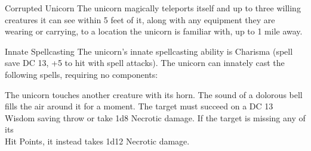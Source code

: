 \begin{DndMonster}[width=0.5\textwidth]{Corrupted Unicorn}
	The unicorn magically teleports itself and up to three willing creatures it can see within 5 feet of it, along with any equipment they are wearing or carrying, to a location the unicorn is familiar with, up to 1 mile away.
	
	\begin{DndMonsterSpells}
		\item[Innate Spellcasting] The unicorn's innate spellcasting ability is Charisma (spell save DC 13, +5 to hit with spell attacks). The unicorn can innately cast the following spells, requiring no components:
	\end{DndMonsterSpells}
	
	The unicorn touches another creature with its horn. The sound of a dolorous bell fills the air around it for a moment. The target must succeed on a DC 13 Wisdom saving throw or take 1d8 Necrotic damage. If the target is missing any of its\\Hit Points, it instead takes 1d12 Necrotic damage.
\end{DndMonster}